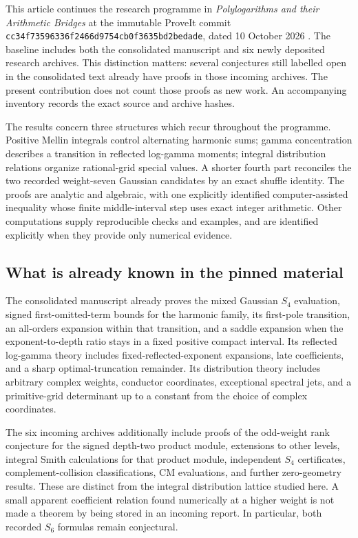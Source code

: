 \documentclass[11pt,a4paper]{article}
\numberwithin{equation}{section}
\theoremstyle{plain}
\theoremstyle{definition}
\theoremstyle{remark}
\begin{document}
This article continues the research programme in \emph{Polylogarithms
and their Arithmetic Bridges} at the immutable ProveIt commit
\texttt{cc34f73596336f2466d9754cb0f3635bd2bedade}, dated
10 October 2026 \cite{cont:ProveIt}. The baseline includes both the
consolidated manuscript and six newly deposited research archives.
This distinction matters: several conjectures still labelled open in
the consolidated text already have proofs in those incoming archives.
The present contribution does not count those proofs as new work.
An accompanying inventory records the exact source and archive hashes.

The results concern three structures which recur throughout the
programme. Positive Mellin integrals control alternating harmonic sums;
gamma concentration describes a transition in reflected log-gamma
moments; integral distribution relations organize rational-grid special
values. A shorter fourth part reconciles the two recorded weight-seven
Gaussian candidates by an exact shuffle identity. The proofs are analytic
and algebraic, with one explicitly identified computer-assisted inequality
whose finite middle-interval step uses exact integer arithmetic. Other
computations supply reproducible checks and examples, and are identified
explicitly when they provide only numerical evidence.

\subsection{What is already known in the pinned material}

The consolidated manuscript already proves the mixed Gaussian
$S_4$ evaluation, signed first-omitted-term bounds for the harmonic
family, its first-pole transition, an all-orders expansion within that
transition, and a saddle expansion when the exponent-to-depth ratio
stays in a fixed positive compact interval. Its reflected log-gamma
theory includes fixed-reflected-exponent expansions, late coefficients,
and a sharp optimal-truncation remainder. Its distribution theory
includes arbitrary complex weights, conductor coordinates, exceptional
spectral jets, and a primitive-grid determinant up to a constant from
the choice of complex coordinates.

The six incoming archives additionally include proofs of the odd-weight
rank conjecture for the signed depth-two product module, extensions to
other levels, integral Smith calculations for that product module,
independent $S_4$ certificates, complement-collision classifications,
CM evaluations, and further zero-geometry results. These are distinct
from the integral distribution lattice studied here. A small apparent
coefficient relation found numerically at a higher weight is not made
a theorem by being stored in an incoming report. In particular, both
recorded $S_6$ formulas remain conjectural.
\end{document}
